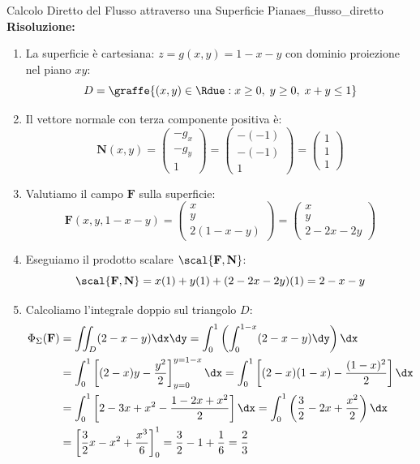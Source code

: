 \begin{esempio}{Calcolo Diretto del Flusso attraverso una Superficie Piana}{es_flusso_diretto}
\medskip\noindent\textbf{Risoluzione:}
\begin{enumerate}
    \item La superficie è cartesiana: $z = g(x,y) = 1 - x - y$ con dominio proiezione nel piano $xy$:
    \[
    D = \graffe{(x,y) \in \Rdue : x \ge 0, \; y \ge 0, \; x + y \le 1}
    \]
    \item Il vettore normale con terza componente positiva è:
    \[
    \mathbf{N}(x,y) = \begin{pmatrix} -g_x \\ -g_y \\ 1 \end{pmatrix} = \begin{pmatrix} -(-1) \\ -(-1) \\ 1 \end{pmatrix} = \begin{pmatrix} 1 \\ 1 \\ 1 \end{pmatrix}
    \]
    \item Valutiamo il campo $\mathbf{F}$ sulla superficie:
    \[
    \mathbf{F}(x, y, 1-x-y) = \begin{pmatrix} x \\ y \\ 2(1 - x - y) \end{pmatrix} = \begin{pmatrix} x \\ y \\ 2 - 2x - 2y \end{pmatrix}
    \]
    \item Eseguiamo il prodotto scalare $\scal{\mathbf{F}, \mathbf{N}}$:
    \[
    \scal{\mathbf{F}, \mathbf{N}} = x(1) + y(1) + (2 - 2x - 2y)(1) = 2 - x - y
    \]
    \item Calcoliamo l'integrale doppio sul triangolo $D$:
    \begin{align*}
    \Phi_\Sigma(\mathbf{F}) &= \iint_D (2 - x - y) \dx\dy = \int_{0}^{1} \left( \int_{0}^{1-x} (2 - x - y) \dy \right) \dx \\
    &= \int_{0}^{1} \left[ (2 - x)y - \frac{y^2}{2} \right]_{y=0}^{y=1-x} \dx = \int_{0}^{1} \left[ (2 - x)(1 - x) - \frac{(1 - x)^2}{2} \right] \dx \\
    &= \int_{0}^{1} \left[ 2 - 3x + x^2 - \frac{1 - 2x + x^2}{2} \right] \dx = \int_{0}^{1} \left( \frac{3}{2} - 2x + \frac{x^2}{2} \right) \dx \\
    &= \left[ \frac{3}{2}x - x^2 + \frac{x^3}{6} \right]_0^1 = \frac{3}{2} - 1 + \frac{1}{6} = \frac{2}{3}
    \end{align*}
\end{enumerate}
\end{esempio}
